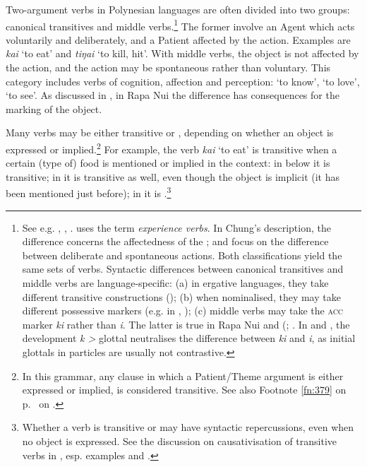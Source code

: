 Two-argument verbs in Polynesian languages are often divided into two groups: ca\-nonical transitives and middle verbs.\footnote{\label{fn:114}See e.g. \citet{Chung1978}, \citet{Hooper1984Neuter}, \citet{Harlow2007Maori}. \citet{Bauer1983} uses the term \textit{experience verbs}. In Chung’s description, the difference concerns the affectedness of the ; \citet{Pawley1973} and \citet{ElbertPukui1979} focus on the difference between deliberate and spontaneous actions. Both classifications yield the same sets of verbs. Syntactic differences between canonical transitives and middle verbs are language-specific: (a) in ergative languages, they take different transitive constructions (); (b) when nominalised, they may take different possessive markers (e.g. in , \citealt[48]{ElbertPukui1979}); (c) middle verbs may take the \textsc{acc} marker \textit{ki} rather than \textit{i}. The latter is true in Rapa Nui and  (\citealt{Bauer1983}; \citealt[267]{Bauer1997}. In  and , the development \textit{k {\textgreater}} glottal neutralises the difference between \textit{ki} and \textit{i}, as initial glottals in particles are usually not contrastive.} The former involve an Agent which acts voluntarily and deliberately, and a Patient affected by the action. Examples are \textit{kai} ‘to eat’ and \textit{\mbox{tiŋa{\ꞌ}i}} ‘to kill, hit’. With middle verbs, the object is not affected by the action, and the action may be spontaneous rather than voluntary. This category includes verbs of cognition, affection and perception: ‘to know’, ‘to love’, ‘to see’. As discussed in , in Rapa Nui the difference has consequences for the marking of the object.

Many verbs may be either transitive or , depending on whether an object is expressed or implied.\footnote{\label{fn:115}In this grammar, any clause in which a Patient/Theme argument is either expressed or implied, is considered transitive. See also Footnote \ref{fn:379} on p.~\pageref{fn:379} on .} For example, the verb \textit{kai} ‘to eat’ is transitive when a certain (type of) food is mentioned or implied in the context: in  below it is transitive; in  it is transitive as well, even though the object is implicit (it has been mentioned just before); in  it is .\footnote{\label{fn:116}Whether a verb is transitive or  may have syntactic repercussions, even when no object is expressed. See the discussion on causativisation of transitive verbs in , esp. examples  and .} 

